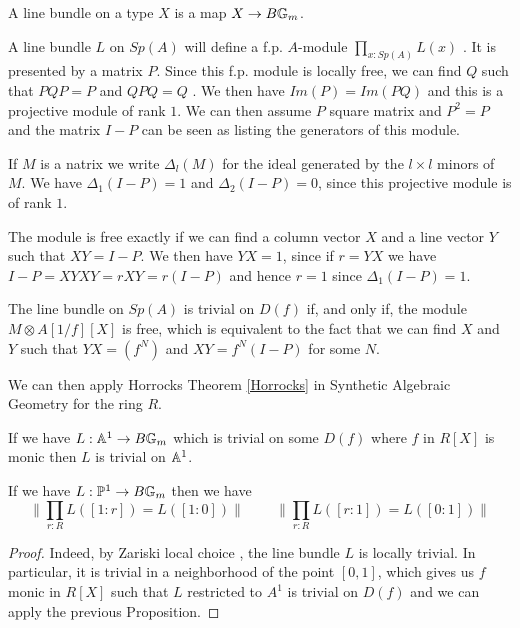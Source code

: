 A line bundle on a type $X$ is a map $X\rightarrow B\mathbb{G}_m$.


\medskip

 A line bundle $L$ on $Sp(A)$ will define a f.p. $A$-module $\prod_{x:Sp(A)}L(x)$ \cite{draft}.
It is presented by a matrix $P$.
Since this f.p. module is locally free, we can find $Q$ such that $PQP = P$ and
$QPQ = Q$ \cite{lombardi-quitte}. We then have $Im(P) = Im(PQ)$ and this is a projective module of rank $1$. We can then assume $P$ square matrix and
$P^2 = P$ and the matrix $I-P$ can  be seen as listing the generators of this module.

If $M$ is a natrix we write $\Delta_l(M)$ for the ideal generated by the $l\times l$ minors of
$M$. We have $\Delta_1(I-P) = 1$ and $\Delta_2(I-P) = 0$, since this projective module is of rank $1$.

The module is free exactly if we can find a column vector $X$ and a line vector $Y$ such that
$XY = I-P$. We then have $YX = 1$, since if $r = YX$ we have $I-P = XYXY = rXY = r(I-P)$ and
hence $r = 1$ since $\Delta_1(I-P) = 1$.



\medskip


The line bundle on $Sp(A)$ is trivial on $D(f)$ if, and only if, the module $M\otimes A[1/f][X]$ is free, which
is equivalent to the fact that we can find $X$ and $Y$ such that $YX = (f^N)$ and $XY = f^N(I-P)$ for some $N$.

We can then apply Horrocks Theorem \ref{Horrocks} in Synthetic Algebraic Geometry for the ring $R$.

\begin{proposition}
  If we have $L:\mathbb{A}^1\rightarrow B\mathbb{G}_m$ which is trivial on some $D(f)$ where $f$ in $R[X]$ is monic
  then $L$ is trivial on $\mathbb{A}^1$.
\end{proposition}

\begin{corollary}\label{c1}
  If we have $L:\mathbb{P}^1\rightarrow B\mathbb{G}_m$ then we have
  $$\|{\prod_{r:R}L([1:r]) = L([1:0])}\|\,\,\,\,\,\,\,\,\,\,\,\,\,\|{\prod_{r:R}L([r:1]) = L([0:1])}\|$$
\end{corollary}

\begin{proof}
Indeed, by Zariski local choice \cite{draft}, the line bundle $L$ is locally trivial. In particular, it is trivial
in a neighborhood of the point $[0,1]$, which gives us $f$ monic in $R[X]$ such that $L$ restricted to $A^1$
is trivial on $D(f)$ and we can apply the previous Proposition.
\end{proof}



